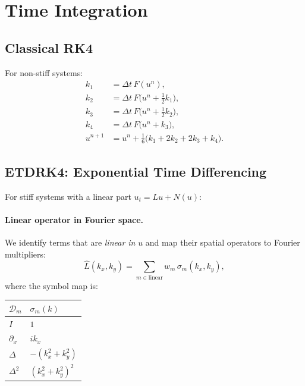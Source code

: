 \documentclass[11pt]{article}
\begin{document}
\section{Time Integration}
\label{sec:integrators}

\subsection{Classical RK4}

For non-stiff systems:
\begin{align}
  k_1 &= \Delta t\, F(u^n), \\
  k_2 &= \Delta t\, F\bigl(u^n + \tfrac{1}{2}k_1\bigr), \\
  k_3 &= \Delta t\, F\bigl(u^n + \tfrac{1}{2}k_2\bigr), \\
  k_4 &= \Delta t\, F\bigl(u^n + k_3\bigr), \\
  u^{n+1} &= u^n + \tfrac{1}{6}\bigl(k_1 + 2k_2 + 2k_3 + k_4\bigr).
\end{align}


\subsection{ETDRK4: Exponential Time Differencing}

For stiff systems with a linear part $u_t = Lu + N(u)$:

\paragraph{Linear operator in Fourier space.}
We identify terms that are \emph{linear in} $u$ and map their spatial
operators to Fourier multipliers:
\begin{equation}\label{eq:L_hat}
  \hat{L}(k_x, k_y) = \sum_{m \in \text{linear}} w_m\,\sigma_m(k_x, k_y),
\end{equation}
where the symbol map is:
\begin{center}
\begin{tabular}{ll}
\toprule
$\mathcal{D}_m$ & $\sigma_m(k)$ \\
\midrule
$I$ & $1$ \\
$\partial_x$ & $ik_x$ \\
$\Delta$ & $-(k_x^2 + k_y^2)$ \\
$\Delta^2$ & $(k_x^2 + k_y^2)^2$ \\
\bottomrule
\end{tabular}
\end{center}
\end{document}
